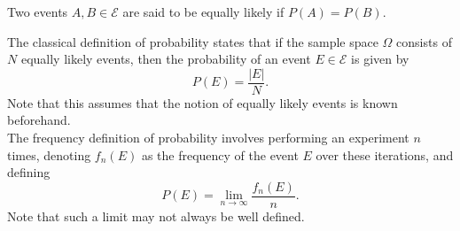 \documentclass[11pt]{article}
\theoremstyle{definition}
\theoremstyle{remark}
\numberwithin{equation}{section}
\begin{document}
    \begin{definition}
        Two events $A, B \in \mathcal{E}$ are said to be equally likely if $P(A) =
        P(B)$.
    \end{definition}

    The classical definition of probability states that if the sample space
    $\Omega$ consists of $N$ equally likely events, then the probability of an
    event $E \in \mathcal{E}$ is given by \[
        P(E) = \frac{|E|}{N}.
    \] 
    Note that this assumes that the notion of equally likely events is known
    beforehand.\\

    The frequency definition of probability involves performing an experiment
    $n$ times, denoting $f_n(E)$ as the frequency of the event $E$ over these
    iterations, and defining \[
        P(E) = \lim_{n \to \infty} \frac{f_n(E)}{n}. 
    \] 
    Note that such a limit may not always be well defined.
\end{document}
